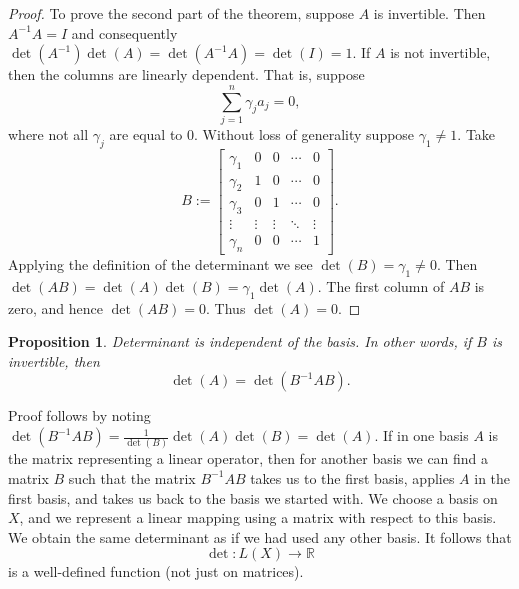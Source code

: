 \documentclass[12pt]{book}
\newcommand{\R}{{\mathbb{R}}}
\theoremstyle{plain}
\newtheorem{prop}[thm]{Proposition}
\theoremstyle{remark}
\theoremstyle{definition}
\theoremstyle{exercise}
\theoremstyle{example}
\begin{document}
\begin{proof}
To prove the second part of the theorem, suppose $A$ is invertible.
Then $A^{-1}A = I$ and consequently $\det(A^{-1})\det(A) = \det(A^{-1}A) = \det(I) = 1$.
If $A$ is not invertible, then the columns are linearly dependent.
That is,
suppose 
\begin{equation*}
\sum_{j=1}^n \gamma_j a_j = 0 ,
\end{equation*}
where not all $\gamma_j$ are equal to 0.
Without loss of generality suppose $\gamma_1\neq 1$.
Take
\begin{equation*}
B := 
\begin{bmatrix}
\gamma_1 & 0 & 0 & \cdots & 0 \\
\gamma_2 & 1 & 0 & \cdots & 0 \\
\gamma_3 & 0 & 1 & \cdots & 0 \\
\vdots & \vdots & \vdots & \ddots & \vdots \\
\gamma_n & 0 & 0 & \cdots & 1
\end{bmatrix} .
\end{equation*}
Applying the definition of the determinant
we see $\det(B) = \gamma_1 \not= 0$.
Then
$\det(AB) = \det(A)\det(B) = \gamma_1\det(A)$.
The first column of $AB$ is zero, and hence $\det(AB) = 0$.  Thus
$\det(A) = 0$.
\end{proof}

\begin{prop}
Determinant is independent of the basis.  In other words, if $B$ is
invertible, then
\begin{equation*}
\det(A) = \det(B^{-1}AB) .
\end{equation*}
\end{prop}

Proof follows by noting
$\det(B^{-1}AB) = 
\frac{1}{\det(B)}\det(A)\det(B) = \det(A)$.
If in one basis $A$ is the matrix representing a
linear operator, then for another basis we can find a matrix $B$ such
that the matrix $B^{-1}AB$ takes us to the first basis, applies $A$ in the
first basis, and takes us back to the basis we started with.
We choose a basis on $X$, and we represent a linear mapping using
a matrix with respect to this basis.  We obtain the
same determinant as if we had used any other basis.
It follows that
\begin{equation*}
\det \colon L(X) \to \R
\end{equation*}
is a well-defined function (not just on matrices).
\end{document}

